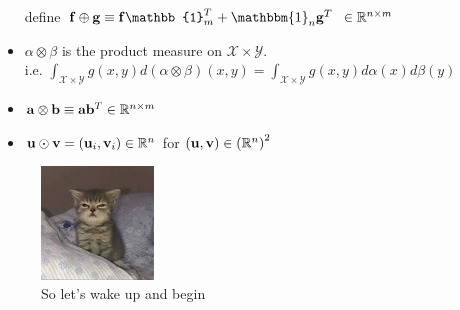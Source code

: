 \begin{itemize}
    define $\mathbf{f} \oplus \mathbf{g} \equiv \mathbf{f} \mathbb{1}_{m}^{T} + \mathbbm{1}_{n} \mathbf{g} ^{T} \;\; \in  \R^{n \times m}$
  \item $\alpha \otimes \beta$ is the product measure on $\mathcal{X} \times \mathcal{Y}$.\\
    i.e. $\int_{\mathcal{X}\times \mathcal{Y}} g(x,y) d(\alpha \otimes \beta) (x, y) = \int_{\mathcal{X}\times \mathcal{Y}} g(x,y) d\alpha(x) d\beta(y)$ 
  \item $\mathbf{a} \otimes \mathbf{b} \equiv \mathbf{a} \mathbf{b}^{T} \in \mathbb{R}^{n \times m}$
  \item $\mathbf{u} \odot \mathbf{v} = \left( \mathbf{u}_i, \mathbf{v}_i \right) \in  \mathbb{R}^{n}$ for $\left( \mathbf{u}, \mathbf{v} \right) \in  \left( \mathbb{R}^{n} \right) ^2$
\end{itemize}

\begin{figure}[h]
  \centering
  \includegraphics[width=3cm]{./figures/sleepy-kitty.jpeg}
  \caption{So let's wake up and begin}
\end{figure} 

